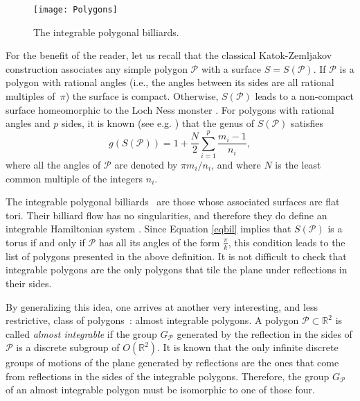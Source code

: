 \documentclass{amsart}
\theoremstyle{definition}
\theoremstyle{remark}
\numberwithin{equation}{section}
\theoremstyle{definition}
\theoremstyle{remark}
\begin{document}
\begin{figure}\renewcommand\thefigure{1}
	\texttt{[image: Polygons]}
	\caption{The integrable polygonal billiards.}\label{polygons}
\end{figure} 

For the benefit of the reader, let us recall that the classical Katok-Zemljakov construction \cite{Construct} associates any simple polygon $\mathcal{P}$ with a surface $S=S(\mathcal{P})$. If $\mathcal{P}$ is a  polygon with rational angles (i.e., the angles between its sides are all rational multiples of~$\pi$) the surface is compact. Otherwise, $S\left(\mathcal{P}\right)$ leads to a non-compact surface homeomorphic to the Loch Ness monster \cite[Theorem 1]{Valdez}.	 For  polygons with rational angles and $p$ sides, it is known (see e.g. \cite{Gutkin}) that the genus of $S(\mathcal P)$ satisfies 
\begin{equation}\label{eqbil}
	g(S(\mathcal P))=1+\frac{N}{2} \sum_{i=1}^p \frac{m_i-1}{n_i},
\end{equation}
where all the angles of $\mathcal{P}$ are denoted by $\pi m_i/n_i$, and where $N$ is the least common multiple of the integers $n_i$.

The integrable polygonal billiards~\cite{GutkinII} are those whose associated  surfaces are flat tori. Their billiard flow has no singularities, and therefore they do define an integrable Hamiltonian system \cite{GutkinII,Gutkin}.  Since Equation \eqref{eqbil} implies that $S(\mathcal P)$ is a torus if and only if $\mathcal P$ has all its angles of the form $\frac{\pi}{k}$, this condition leads to the list of polygons presented in the above definition. It is not difficult to check that integrable polygons are the only polygons that tile the plane under reflections in their sides. 


By generalizing this idea, one arrives at another very interesting, and less restrictive, class of polygons~\cite{GutkinII}: {almost integrable polygons}. A polygon $\mathcal{P}\subset\mathbb{R}^{2}$ is called {\em almost integrable}\/ if the group $G_\mathcal{P}$ generated by the reflection in the sides of $\mathcal{P}$ is a discrete subgroup of $O(\mathbb{R}^2)$. It is known that the only infinite discrete groups of motions of the plane generated by reflections are the ones that come from reflections in the sides of the integrable polygons. Therefore, the group $G_\mathcal{P}$ of an almost integrable polygon must be isomorphic to one of those four. 
\end{document}
